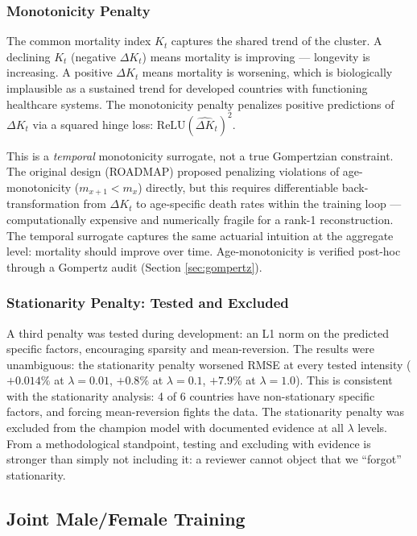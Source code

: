 \documentclass[11pt,a4paper]{article}
\begin{document}
\subsubsection{Monotonicity Penalty}

The common mortality index $K_t$ captures the shared trend of the cluster. A declining $K_t$ (negative $\Delta K_t$) means mortality is improving --- longevity is increasing. A positive $\Delta K_t$ means mortality is worsening, which is biologically implausible as a sustained trend for developed countries with functioning healthcare systems. The monotonicity penalty penalizes positive predictions of $\Delta K_t$ via a squared hinge loss: $\text{ReLU}(\hat{\Delta K}_t)^2$.

This is a \textit{temporal} monotonicity surrogate, not a true Gompertzian constraint. The original design (ROADMAP) proposed penalizing violations of age-monotonicity ($m_{x+1} < m_x$) directly, but this requires differentiable back-transformation from $\Delta K_t$ to age-specific death rates within the training loop --- computationally expensive and numerically fragile for a rank-1 reconstruction. The temporal surrogate captures the same actuarial intuition at the aggregate level: mortality should improve over time. Age-monotonicity is verified post-hoc through a Gompertz audit (Section \ref{sec:gompertz}).

\subsubsection{Stationarity Penalty: Tested and Excluded}

A third penalty was tested during development: an L1 norm on the predicted specific factors, encouraging sparsity and mean-reversion. The results were unambiguous: the stationarity penalty worsened RMSE at every tested intensity ($+0.014\%$ at $\lambda = 0.01$, $+0.8\%$ at $\lambda = 0.1$, $+7.9\%$ at $\lambda = 1.0$). This is consistent with the stationarity analysis: 4 of 6 countries have non-stationary specific factors, and forcing mean-reversion fights the data. The stationarity penalty was excluded from the champion model with documented evidence at all $\lambda$ levels. From a methodological standpoint, testing and excluding with evidence is stronger than simply not including it: a reviewer cannot object that we ``forgot'' stationarity.

\subsection{Joint Male/Female Training}\label{sec:joint_training}
\end{document}
